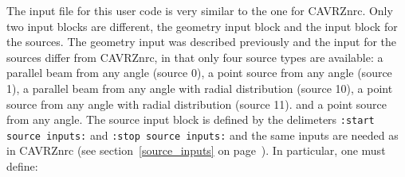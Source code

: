 \documentclass[12pt,twoside]{article}  %
\begin{document}
The input file for this user code is very similar to the one for
CAVRZnrc. Only two input blocks are different, the geometry input block
and the input block for the sources. The geometry input was described
previously and the input for the sources differ from CAVRZnrc, in that
only four source types are available: a parallel beam from any angle
(source 0), a point source from any angle (source 1), a parallel beam
from any angle with radial distribution (source 10), a point source from
any angle with radial distribution (source 11). 
and a point source from any angle. The source input block is defined by
the delimeters {\tt :start source inputs:} and {\tt :stop source inputs:}
and the same inputs are needed as in CAVRZnrc (see
section~\ref{source_inputs} on page~\pageref{source_inputs}).  In
particular, one must define:
\end{document}
